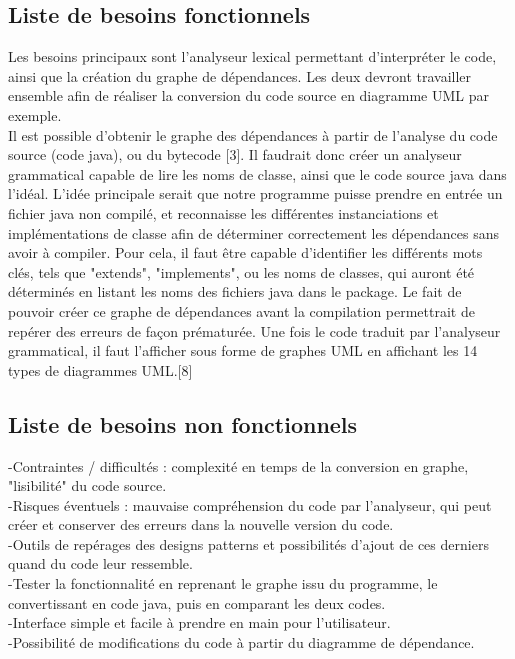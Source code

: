\documentclass{article}
\begin{document}
\subsection{Liste de besoins fonctionnels}
    Les besoins principaux sont l'analyseur lexical permettant d'interpréter le code, ainsi que la création du graphe de dépendances. Les deux devront travailler ensemble afin de réaliser la conversion du code source en diagramme UML par exemple.\\
    Il est possible d'obtenir le graphe des dépendances à partir de l'analyse du code source (code java), ou du bytecode [3]. Il faudrait donc créer un analyseur grammatical capable de lire les noms de classe, ainsi que le code source java dans l'idéal. L'idée principale serait que notre programme puisse prendre en entrée un fichier java non compilé, et reconnaisse les différentes instanciations et implémentations de classe afin de déterminer correctement les dépendances sans avoir à compiler. Pour cela, il faut être capable d'identifier les différents mots clés, tels que "extends", "implements", ou les noms de classes, qui auront été déterminés en listant les noms des fichiers java dans le package. Le fait de pouvoir créer ce graphe de dépendances avant la compilation permettrait de repérer des erreurs de façon prématurée. %
    Une fois le code traduit par l'analyseur grammatical, il faut l'afficher sous forme de graphes UML en affichant les 14 types de diagrammes UML.[8]
\subsection{Liste de besoins non fonctionnels}
    -Contraintes / difficultés : complexité en temps de la conversion en graphe, "lisibilité" du code source.\\
    -Risques éventuels : mauvaise compréhension du code par l'analyseur, qui peut créer et conserver des erreurs dans la nouvelle version du code.\\
    -Outils de repérages des designs patterns et possibilités d'ajout de ces derniers quand du code leur ressemble.\\
    -Tester la fonctionnalité en reprenant le graphe issu du programme,  le convertissant en code java, puis en comparant les deux codes.\\
    -Interface simple et facile à prendre en main pour l'utilisateur.\\
    -Possibilité de modifications du code à partir du diagramme de dépendance.\\
    
\end{document}
